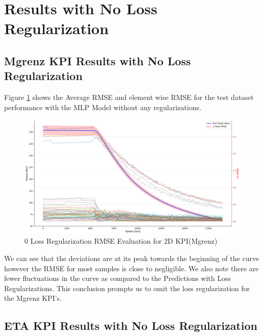 \documentclass{report} %
\begin{document}
\section{Results with No Loss Regularization}\label{sec:Results with No Loss Regularization}

\subsection{Mgrenz \ac{KPI} Results with No Loss Regularization}\label{subsec:2D Mgrenz Results with No Loss Regularization}

Figure \ref{fig:0 Loss Regularization RMSE Evaluation for 2D KPI(Mgrenz)} shows the Average \ac{RMSE} and element wise \ac{RMSE} for the test dataset performance with the MLP Model without any regularizations.\\

\begin{figure}[H]
    \centering
    \includegraphics[width=1\textwidth]{./ReportImages/RMSE_MLP_no_lossreg_y1.png} 
    \caption{0 Loss Regularization \ac{RMSE} Evaluation for 2D KPI(Mgrenz)} 
    \label{fig:0 Loss Regularization RMSE Evaluation for 2D KPI(Mgrenz)}
\end{figure}

We can see that the deviations are at its peak towards the beginning of the curve however the \ac{RMSE} for most samples is close to negligible.
We also note there are fewer fluctuations in the curve as compared to the Predictions with Loss Regularizations.
This conclusion prompts us to omit the loss regularization for the Mgrenz \ac{KPI}'s.\\

\subsection{ETA \ac{KPI} Results with No Loss Regularization}\label{subsec:3D ETA Results with No Loss Regularization}
\end{document}
